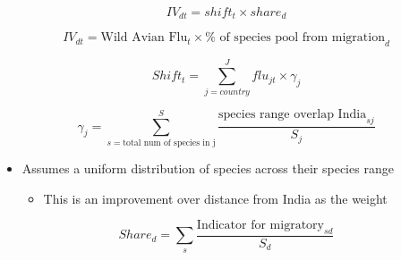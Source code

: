 \documentclass[
  letterpaper,
]{article}
\providecommand{\tightlist}{%
  \setlength{\itemsep}{0pt}\setlength{\parskip}{0pt}}\usepackage{longtable,booktabs,array}
\begin{document}
\begin{tcolorbox}
\[
IV_{dt} = shift_t \times share_d
\]

\[
IV_{dt} = \text{Wild Avian Flu}_t \times \text{%
\]

\[
Shift_t = \sum_{j = country}^J flu_{jt} \times \gamma_j
\]

\[
\gamma_j = \sum_{s =\text{total num of species in j}}^S \frac{\text{species range overlap India}_{sj}}{S_j}
\]

\begin{itemize}
\tightlist
\item
  Assumes a uniform distribution of species across their species range

  \begin{itemize}
  \tightlist
  \item
    This is an improvement over distance from India as the weight
  \end{itemize}
\end{itemize}

\[
Share_d =  \sum_s \frac{\text{Indicator for migratory}_{sd}}{S_d}
\]

\end{tcolorbox}
\end{document}

